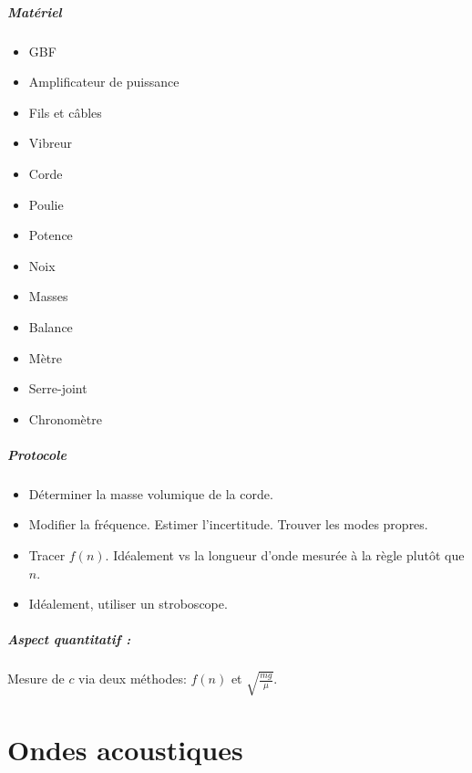 \documentclass[11pt]{report}
\numberwithin{figure}{section}
\numberwithin{equation}{section}
\numberwithin{table}{section}
\newcommand{\1}{\boldsymbol{1}}
\begin{document}
\begin{tcolorbox}[breakable, enhanced, colback=red!2!white,colframe=mycolor!85!black,title=\textbf{\textbf{Expérience}}]
\paragraph*{Matériel}
\begin{itemize}
\item GBF
\item Amplificateur de puissance
\item Fils et câbles
\item Vibreur
\item Corde
\item Poulie
\item Potence
\item Noix
\item Masses
\item Balance
\item Mètre
\item Serre-joint
\item Chronomètre
\end{itemize}

\paragraph*{Protocole } 

\begin{itemize}[label=$\triangleright$]
		\item Déterminer la masse volumique de la corde.
		\item Modifier la fréquence. Estimer l'incertitude. Trouver les modes propres.
		\item Tracer $f(n)$. Idéalement vs la longueur d'onde mesurée à la règle plutôt que $n$.
		\item Idéalement, utiliser un stroboscope.
\end{itemize}

\paragraph*{Aspect quantitatif :} Mesure de $c$ via deux méthodes: $f(n)$ et $\sqrt{\frac{m g}{\mu}}$.


\end{tcolorbox}
  

\newpage



\chapter{Ondes acoustiques}
\end{document}
